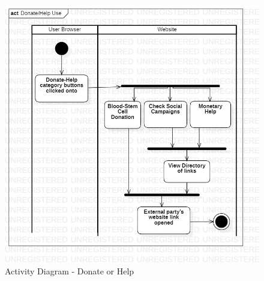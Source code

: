 \begin{figure}[H]
  \centering
  \includegraphics[width=\linewidth]{img/activity-diagram-donate-or-help.jpg}
  \caption{Activity Diagram - Donate or Help}
\end{figure}

\vspace*{\fill}
\newpage

